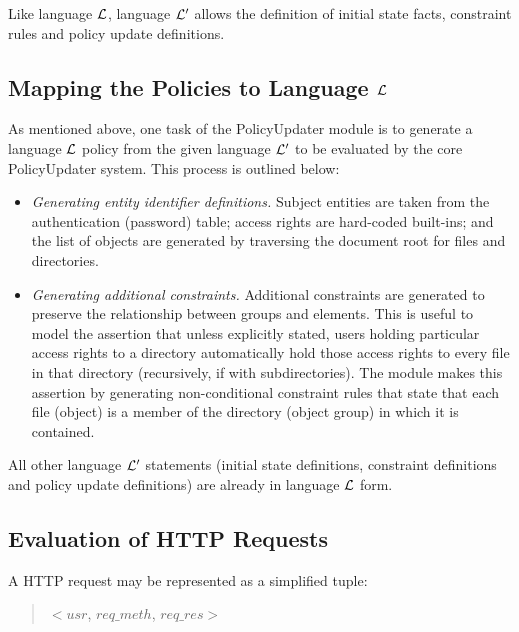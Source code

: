 \documentclass[global,twocolumn,final]{svjour}
\begin{document}
      Like language ${\cal L}$, language ${\cal L'}$ allows the definition of
      initial state facts, constraint rules and policy update definitions.

    \subsection{Mapping the Policies to Language ${\cal L}$}

      As mentioned above, one task of the PolicyUpdater module is to generate
      a language ${\cal L}$ policy from the given language ${\cal L'}$ to be
      evaluated by the core PolicyUpdater system. This process is outlined
      below:

      \begin{itemize}
        \item
          {\em Generating entity identifier definitions.} Subject entities are
          taken from the authentication (password) table; access rights are
          hard-coded built-ins; and the list of objects are generated by
          traversing the document root for files and directories.
        \item
          {\em Generating additional constraints.} Additional constraints are
          generated to preserve the relationship between groups and elements.
          This is useful to model the assertion that unless explicitly stated,
          users holding particular access rights to a directory automatically
          hold those access rights to every file in that directory
          (recursively, if with subdirectories). The module makes this
          assertion by generating non-conditional constraint rules that state
          that each file (object) is a member of the directory (object group)
          in which it is contained.
      \end{itemize}

      All other language ${\cal L'}$ statements (initial state definitions,
      constraint definitions and policy update definitions) are already in
      language ${\cal L}$ form.

    \subsection{Evaluation of HTTP Requests}

      A HTTP request may be represented as a simplified tuple:

      \begin{quote}
        $<$$usr$, $req\_meth$, $req\_res$$>$
      \end{quote}
\end{document}
